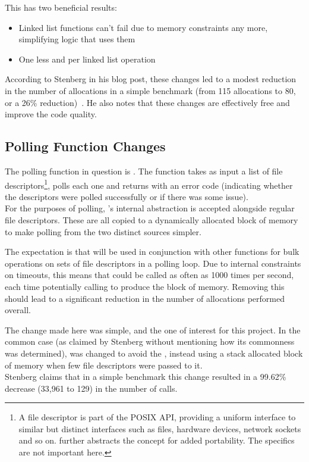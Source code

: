 This has two beneficial results:

\begin{itemize}
	\itemsep-0.25em
	\item Linked list functions can't fail due to memory constraints any more, simplifying logic that uses them
	\item One less \malloc{} and \free{} per linked list operation
\end{itemize}

According to Stenberg in his blog post, these changes led to a modest reduction in the number of allocations in a simple benchmark (from 115 allocations to 80, or a 26\% reduction)~\cite{curlmalloc}. He also notes that these changes are effectively free and improve the code quality.

\subsection{Polling Function Changes}

The polling function in question is . The function takes as input a list of file descriptors\footnote{A file descriptor is part of the POSIX API, providing a uniform interface to similar but distinct interfaces such as files, hardware devices, network sockets and so on.  further abstracts the concept for added portability. The specifics are not important here.}, polls each one and returns with an error code (indicating whether the descriptors were polled successfully or if there was some issue).\\
For the purposes of polling, 's internal abstraction is accepted alongside regular file descriptors. These are all copied to a dynamically allocated block of memory to make polling from the two distinct sources simpler.

The expectation is that  will be used in conjunction with other functions for bulk operations on sets of file descriptors in a polling loop. Due to internal constraints on timeouts, this means that  could be called as often as 1000 times per second, each time potentially calling \malloc{} to produce the block of memory. Removing this \malloc{} should lead to a significant reduction in the number of allocations performed overall.

The change made here was simple, and the one of interest for this project. In the common case (as claimed by Stenberg without mentioning how its commonness was determined),  was changed to avoid the \malloc{}, instead using a stack allocated block of memory when few file descriptors were passed to it.\\
Stenberg claims that in a simple benchmark this change resulted in a 99.62\% decrease (33,961 to 129) in the number of \malloc{} calls.


